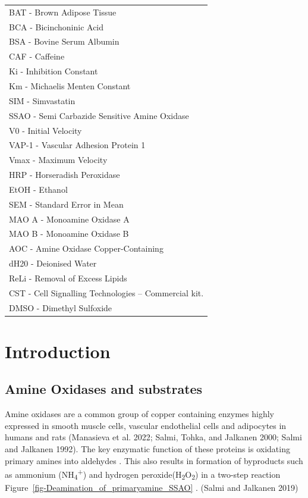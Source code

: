 \documentclass[
  letterpaper,
  DIV=11,
  numbers=noendperiod]{scrreprt}
\begin{document}
\begin{longtable}[]{@{}l@{}}
\toprule\noalign{}
\endhead
\bottomrule\noalign{}
\endlastfoot
BAT - Brown Adipose Tissue \\
BCA - Bicinchoninic Acid \\
BSA - Bovine Serum Albumin \\
CAF - Caffeine \\
Ki - Inhibition Constant \\
Km - Michaelis Menten Constant \\
SIM - Simvastatin \\
SSAO - Semi Carbazide Sensitive Amine Oxidase \\
V0 - Initial Velocity \\
VAP-1 - Vascular Adhesion Protein 1 \\
Vmax - Maximum Velocity \\
HRP - Horseradish Peroxidase \\
EtOH - Ethanol \\
SEM - Standard Error in Mean \\
MAO A - Monoamine Oxidase A \\
MAO B - Monoamine Oxidase B \\
AOC - Amine Oxidase Copper-Containing \\
dH20 - Deionised Water \\
ReLi - Removal of Excess Lipids \\
CST - Cell Signalling Technologies -- Commercial kit. \\
DMSO - Dimethyl Sulfoxide \\
\end{longtable}


\chapter{Introduction}\label{introduction}

\section{\texorpdfstring{\textbf{Amine Oxidases and
substrates}}{Amine Oxidases and substrates}}\label{amine-oxidases-and-substrates}

Amine oxidases are a common group of copper containing enzymes highly
expressed in smooth muscle cells, vascular endothelial cells and
adipocytes in humans and rats (Manasieva et al. 2022; Salmi, Tohka, and
Jalkanen 2000; Salmi and Jalkanen 1992). The key enzymatic function of
these proteins is oxidating primary amines into aldehydes . This also
results in formation of byproducts such as ammonium
(NH\textsubscript{4}\textsuperscript{+}) and hydrogen
peroxide(H\textsubscript{2}O\textsubscript{2}) in a two-step reaction
Figure~\ref{fig-Deamination_of_primaryamine_SSAO} . (Salmi and Jalkanen
2019)
\end{document}

